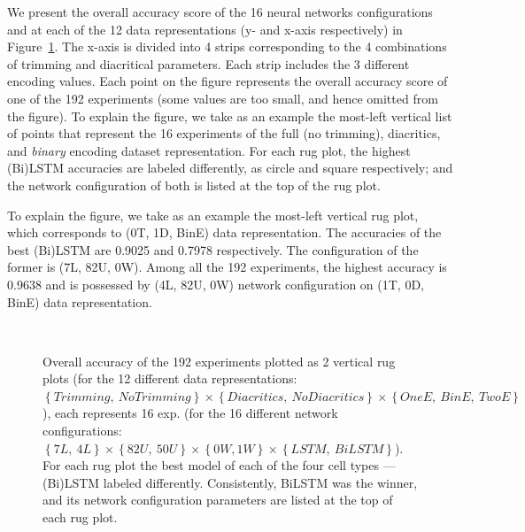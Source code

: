 We present the overall accuracy score of the 16 neural networks configurations and at each of the 12 data representations (y- and x-axis respectively) in Figure~\ref{Fig:ArabicModelsResults}. The x-axis is divided into 4 strips corresponding to the 4 combinations of trimming and diacritical parameters. Each strip includes the 3 different encoding values. Each point on the figure represents the overall accuracy score of one of the 192 experiments (some values are too small, and hence omitted from the figure). To explain the figure, we take as an example the most-left vertical list of points that represent the 16 experiments of the full (no trimming), diacritics, and \textit{binary} encoding dataset representation. For each rug plot, the highest (Bi)LSTM accuracies are labeled differently, as circle and square respectively; and the network configuration of both is listed at the top of the rug plot.

To explain the figure, we take as an example the most-left vertical rug plot, which corresponds to (0T, 1D, BinE) data representation. The accuracies of the best (Bi)LSTM are 0.9025 and 0.7978 respectively. The configuration of the former is (7L, 82U, 0W). Among all the 192 experiments, the highest accuracy is 0.9638 and is possessed by (4L, 82U, 0W) network configuration on (1T, 0D, BinE) data representation.



\begin{figure}[!t]

	
	\caption{Overall accuracy of the 192 experiments plotted as 2 vertical rug plots (for the 12 different data representations: $\left\{\mathit{Trimming},\ \mathit{No Trimming} \right\} \times \left\{\mathit{Diacritics},\ \mathit{No Diacritics} \right\} \times \left\{\mathit{OneE},\ \mathit{BinE},\ \mathit{TwoE}\right\}$), each represents 16 exp. (for the 16 different network configurations: $\left\{7L,\ 4L\right\} \times \left\{82U,\ 50U\right\} \times \left\{0W, 1W\right\} \times \left\{LSTM,\ BiLSTM\right\}$). For each rug plot the best model of each of the four cell types ---(Bi)LSTM labeled differently. Consistently, BiLSTM was the winner, and its network configuration parameters are listed at the top of each rug plot.}~\label{Fig:ArabicModelsResults}
\end{figure}




